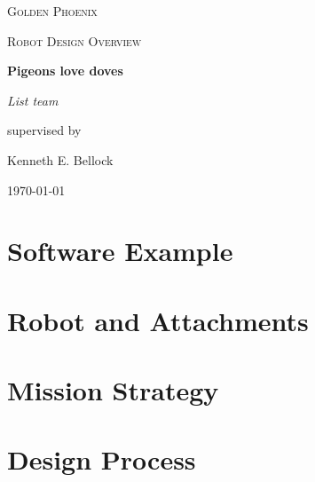 \documentclass[letter, article]{article}
\begin{document}
\begin{titlepage}
	\centering
	{\scshape\LARGE Golden Phoenix \par}
	\vspace{1cm}
	{\scshape\Large Robot Design Overview\par}
	\vspace{1.5cm}
	{\huge\bfseries Pigeons love doves\par}
	\vspace{2cm}
	{\Large\itshape List team\par}
	\vfill
	supervised by\par
	Kenneth E. Bellock

	\vfill

	{\large \today\par}
\end{titlepage}

\section{Software Example}

\section{Robot and Attachments}

\section{Mission Strategy}

\section{Design Process}
\end{document}
